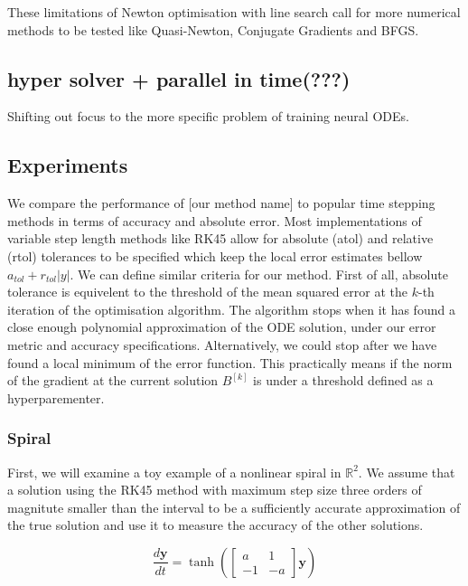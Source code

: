 \documentclass{article}
\begin{document}
    These limitations of Newton optimisation with line search call for more numerical methods to be tested like Quasi-Newton, Conjugate Gradients and BFGS.

    \subsection{hyper solver + parallel in time(???)}
    Shifting out focus to the more specific problem of training neural ODEs.

    \subsection{Experiments}
    We compare the performance of [our method name] to popular time stepping methods in terms of accuracy and absolute error.
    Most implementations of variable step length methods like RK45 allow for absolute (atol) and relative (rtol)
    tolerances to be specified which keep the local error estimates bellow $a_{tol} + r_{tol} |y|$.
    We can define similar criteria for our method.
    First of all, absolute tolerance is equivelent to the threshold of the mean squared error at the $k$-th iteration of
    the optimisation algorithm.
    The algorithm stops when it has found a close enough polynomial approximation of the ODE solution, under our error
    metric and accuracy specifications.
    Alternatively, we could stop after we have found a local minimum of the error function.
    This practically means if the norm of the gradient at the current solution $B^{[k]}$ is under a threshold defined as
    a hyperparementer.

    \subsubsection{Spiral}
    First, we will examine a toy example of a nonlinear spiral in $\mathbb{R}^{2}$.
    We assume that a solution using the RK45 method with maximum step size three orders of magnitute smaller than the
    interval to be a sufficiently accurate approximation of the true solution and use it to measure the accuracy of the
    other solutions.

    \begin{equation*}
        \frac{d \pmb{y} }{dt} =
        \tanh(
        \begin{bmatrix}
            a & 1 \\ -1 & -a
        \end{bmatrix}
        \pmb{y}
        )
    \end{equation*}
\end{document}
